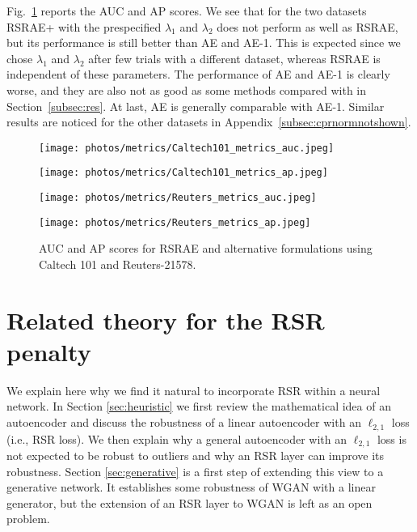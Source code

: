 \documentclass{article} \usepackage{iclr2020_conference,times}
\def\Secref#1{Section~\ref{#1}}
\begin{document}
Fig.~\ref{fig:cprall} reports the AUC and AP scores. We see that for the two datasets RSRAE+ with the prespecified $\lambda_1$ and $\lambda_2$ does not perform as well as RSRAE, but its performance is still better than AE and AE-1. This is expected since we chose $\lambda_1$ and $\lambda_2$ after few trials with a different dataset, whereas RSRAE is independent of these parameters.
The performance of AE and AE-1 is clearly worse, and they are also not as good as some methods compared with in \Secref{subsec:res}.
At last, AE is generally comparable with AE-1. Similar results are noticed for the other datasets in Appendix~\ref{subsec:cprnormnotshown}.





\begin{figure}[ht]
\centering
\begin{minipage}[t]{0.48\textwidth}
\centering
\texttt{[image: photos/metrics/Caltech101\_metrics\_auc.jpeg]}
\end{minipage}
\begin{minipage}[t]{0.48\textwidth}
\centering
\texttt{[image: photos/metrics/Caltech101\_metrics\_ap.jpeg]}
\end{minipage}







\centering
\begin{minipage}[t]{0.48\textwidth}
\centering
\texttt{[image: photos/metrics/Reuters\_metrics\_auc.jpeg]}
\end{minipage}
\begin{minipage}[t]{0.48\textwidth}
\centering
\texttt{[image: photos/metrics/Reuters\_metrics\_ap.jpeg]}
\end{minipage}
\caption{AUC and AP scores for RSRAE and alternative formulations using Caltech 101 and Reuters-21578.}
\label{fig:cprall}
\end{figure}








\section{Related theory for the RSR penalty}
\label{sec:relatedtheory}

We explain here why we find it natural to incorporate RSR within a neural network. In Section \ref{sec:heuristic} we first review the mathematical idea of an autoencoder and discuss the robustness of a linear autoencoder with an $\ell_{2,1}$ loss (i.e., RSR loss). We then explain why a general autoencoder with an  $\ell_{2,1}$ loss is not expected to be robust to outliers and why an RSR layer can improve its robustness. Section \ref{sec:generative} is a first step of extending this view to a generative network. It establishes some robustness of WGAN with a linear generator, but the extension of an RSR layer to WGAN is left as an open problem. 
\end{document}

